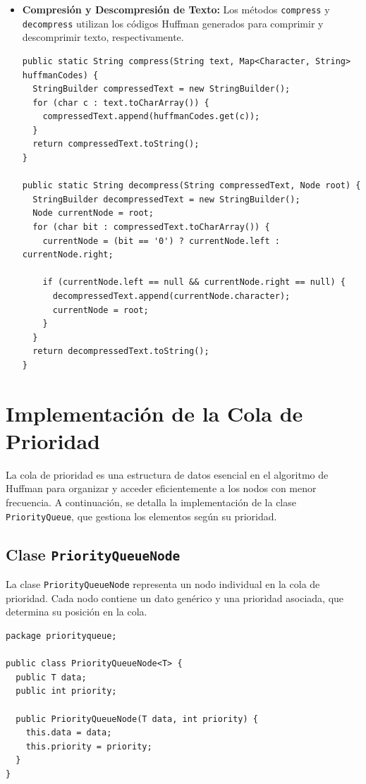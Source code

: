 \documentclass[10pt, a4paper]{article}
\newcommand{\mj}[1]{\texttt{#1}}
\begin{document}
\begin{itemize}
  \item \textbf{Compresión y Descompresión de Texto:} Los métodos \mj{compress} y \mj{decompress} utilizan los códigos Huffman generados para comprimir y descomprimir texto, respectivamente.

\begin{verbatim}
public static String compress(String text, Map<Character, String> huffmanCodes) {
  StringBuilder compressedText = new StringBuilder();
  for (char c : text.toCharArray()) {
    compressedText.append(huffmanCodes.get(c));
  }
  return compressedText.toString();
}

public static String decompress(String compressedText, Node root) {
  StringBuilder decompressedText = new StringBuilder();
  Node currentNode = root;
  for (char bit : compressedText.toCharArray()) {
    currentNode = (bit == '0') ? currentNode.left : currentNode.right;

    if (currentNode.left == null && currentNode.right == null) {
      decompressedText.append(currentNode.character);
      currentNode = root;
    }
  }
  return decompressedText.toString();
}
\end{verbatim}
\end{itemize}

\section{Implementación de la Cola de Prioridad}

La cola de prioridad es una estructura de datos esencial en el algoritmo de Huffman para organizar y acceder eficientemente a los nodos con menor frecuencia. A continuación, se detalla la implementación de la clase \mj{PriorityQueue}, que gestiona los elementos según su prioridad.

\subsection{Clase \mj{PriorityQueueNode}}

La clase \mj{PriorityQueueNode} representa un nodo individual en la cola de prioridad. Cada nodo contiene un dato genérico y una prioridad asociada, que determina su posición en la cola.

\begin{verbatim}
package priorityqueue;

public class PriorityQueueNode<T> {
  public T data;
  public int priority;

  public PriorityQueueNode(T data, int priority) {
    this.data = data;
    this.priority = priority;
  }
}
\end{verbatim}
\end{document}
